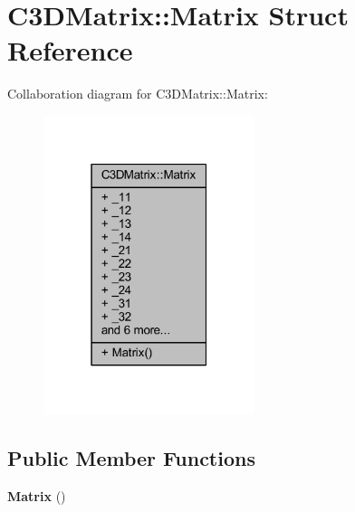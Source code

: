 \section{C3\+D\+Matrix\+:\+:Matrix Struct Reference}
\label{struct_c3_d_matrix_1_1_matrix}


Collaboration diagram for C3\+D\+Matrix\+:\+:Matrix\+:\nopagebreak
\begin{figure}[H]
\begin{center}
\leavevmode
\includegraphics[width=175pt]{d8/d47/struct_c3_d_matrix_1_1_matrix__coll__graph}
\end{center}
\end{figure}
\subsection*{Public Member Functions}
\begin{DoxyCompactItemize}
\item 
{\bf Matrix} ()
\end{DoxyCompactItemize}
